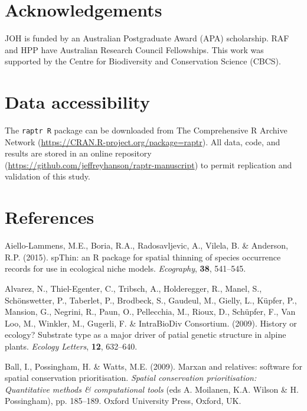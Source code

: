 \section{Acknowledgements}\label{acknowledgements}

JOH is funded by an Australian Postgraduate Award (APA) scholarship. RAF
and HPP have Australian Research Council Fellowships. This work was
supported by the Centre for Biodiversity and Conservation Science
(CBCS).

\section{Data accessibility}\label{data-accessibility}

The \texttt{raptr R} package can be downloaded from The Comprehensive R
Archive Network (\url{https://CRAN.R-project.org/package=raptr}). All
data, code, and results are stored in an online repository
(\url{https://github.com/jeffreyhanson/raptr-manuscript}) to permit
replication and validation of this study.

\section{References}\label{references}



\hypertarget{refs}{}
\hypertarget{ref-r454}{}
Aiello-Lammens, M.E., Boria, R.A., Radosavljevic, A., Vilela, B. \&
Anderson, R.P. (2015). spThin: an R package for spatial thinning of
species occurrence records for use in ecological niche models.
\emph{Ecography}, \textbf{38}, 541--545.

\hypertarget{ref-r461}{}
Alvarez, N., Thiel-Egenter, C., Tribsch, A., Holderegger, R., Manel, S.,
Schönswetter, P., Taberlet, P., Brodbeck, S., Gaudeul, M., Gielly, L.,
Küpfer, P., Mansion, G., Negrini, R., Paun, O., Pellecchia, M., Rioux,
D., Schüpfer, F., Van Loo, M., Winkler, M., Gugerli, F. \& IntraBioDiv
Consortium. (2009). History or ecology? Substrate type as a major driver
of patial genetic structure in alpine plants. \emph{Ecology Letters},
\textbf{12}, 632--640.

\hypertarget{ref-r22}{}
Ball, I., Possingham, H. \& Watts, M.E. (2009). Marxan and relatives:
software for spatial conservation prioritisation. \emph{Spatial
conservation prioritisation: Quantitative methods \& computational
tools} (eds A. Moilanen, K.A. Wilson \& H. Possingham), pp. 185--189.
Oxford University Press, Oxford, UK.

